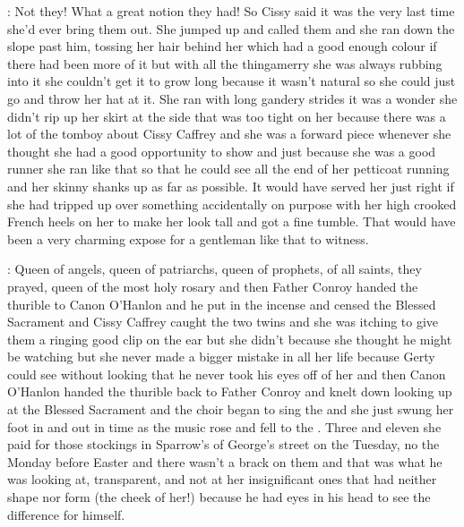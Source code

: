 :
Not they!
What a great notion they had!
So Cissy said it was the very
last time she'd ever bring them out.
She jumped up and called them and she
ran down the slope past him,
tossing her hair behind her which had a good
enough colour if there had been more of it but with all the thingamerry
she was always rubbing into it she couldn't get it to grow long because it
wasn't natural so she could just go and throw her hat at it.
She ran
with long gandery strides it was a wonder she didn't rip up her skirt at
the side that was too tight on her
because there was a lot of the tomboy
about Cissy Caffrey and she was a forward piece whenever she thought
she had a good opportunity to show and just because she was a good runner
she ran like that so that he could see all the end of her petticoat
running and her skinny shanks up as far as possible.
It would have
served her just right if she had tripped up over something accidentally
on purpose with her high crooked French heels on her to make her look
tall and got a fine tumble.
That would have been a very charming
expose for a gentleman like that to witness.

:
Queen of angels,
queen of patriarchs,
queen of prophets,
of all saints,
they prayed,
queen of the most holy rosary
and then Father Conroy handed
the thurible to Canon O'Hanlon and he put in the incense and censed the
Blessed Sacrament and Cissy Caffrey caught the two twins and she was
itching to give them a ringing good clip on the ear but she didn't because
she thought he might be watching but she never made a bigger mistake in
all her life because Gerty could see without looking that he never
took his eyes off of her and then Canon O'Hanlon handed the thurible
back to Father Conroy and knelt down looking up at the Blessed Sacrament
and the choir began to sing the  and she just swung her foot
in and out in time as the music rose and fell to the .
Three and eleven she paid for those stockings
in Sparrow's of George's street
on the Tuesday,
no the Monday before Easter
and there wasn't a brack on them
and that was what he was looking at,
transparent,
and not at her insignificant ones that had neither shape nor form
(the cheek of her!) because he had eyes in his head to see the difference
for himself.

